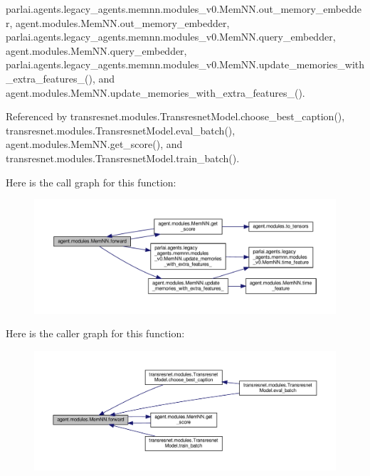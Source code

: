 parlai.\+agents.\+legacy\+\_\+agents.\+memnn.\+modules\+\_\+v0.\+Mem\+N\+N.\+out\+\_\+memory\+\_\+embedder, agent.\+modules.\+Mem\+N\+N.\+out\+\_\+memory\+\_\+embedder, parlai.\+agents.\+legacy\+\_\+agents.\+memnn.\+modules\+\_\+v0.\+Mem\+N\+N.\+query\+\_\+embedder, agent.\+modules.\+Mem\+N\+N.\+query\+\_\+embedder, parlai.\+agents.\+legacy\+\_\+agents.\+memnn.\+modules\+\_\+v0.\+Mem\+N\+N.\+update\+\_\+memories\+\_\+with\+\_\+extra\+\_\+features\+\_\+(), and agent.\+modules.\+Mem\+N\+N.\+update\+\_\+memories\+\_\+with\+\_\+extra\+\_\+features\+\_\+().



Referenced by transresnet.\+modules.\+Transresnet\+Model.\+choose\+\_\+best\+\_\+caption(), transresnet.\+modules.\+Transresnet\+Model.\+eval\+\_\+batch(), agent.\+modules.\+Mem\+N\+N.\+get\+\_\+score(), and transresnet.\+modules.\+Transresnet\+Model.\+train\+\_\+batch().

Here is the call graph for this function\+:
\nopagebreak
\begin{figure}[H]
\begin{center}
\leavevmode
\includegraphics[width=350pt]{classagent_1_1modules_1_1MemNN_aa4fbd692135afd7ec2fa94afafe34b73_cgraph}
\end{center}
\end{figure}
Here is the caller graph for this function\+:
\nopagebreak
\begin{figure}[H]
\begin{center}
\leavevmode
\includegraphics[width=350pt]{classagent_1_1modules_1_1MemNN_aa4fbd692135afd7ec2fa94afafe34b73_icgraph}
\end{center}
\end{figure}
\mbox{\label{classagent_1_1modules_1_1MemNN_a830d84e09fae11dac5df4cbf8225bd26}} 
